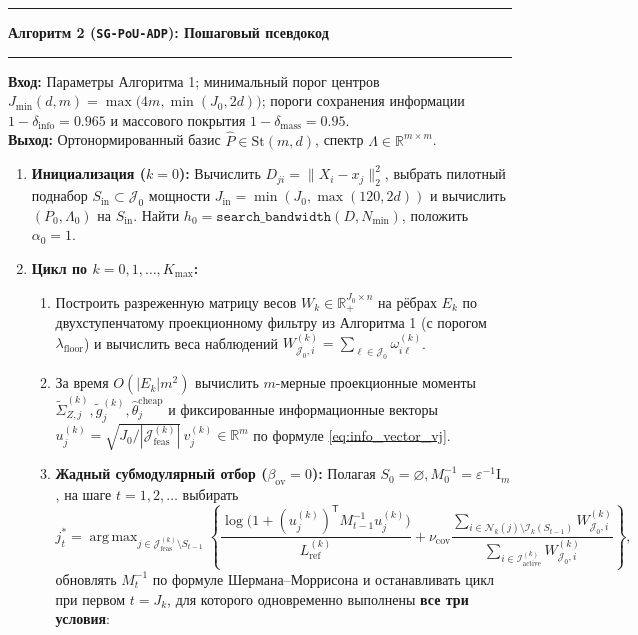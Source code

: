 \documentclass[11pt,a4paper]{article}
\newcommand{\R}{\mathbb{R}}
\newcommand{\Id}{\mathrm{I}}
\newcommand{\T}{^{\mathsf{T}}}
\newcommand{\St}{\mathrm{St}}
\newcommand{\II}{\mathcal{I}}
\newcommand{\JJJ}{\mathcal{J}}
\newcommand{\init}{\mathrm{in}}
\DeclareMathOperator{\argmax}{arg\,max}
\theoremstyle{definition}
\theoremstyle{remark}
\begin{document}
\vspace{4pt}
\noindent\rule{\textwidth}{0.8pt}
\textbf{Алгоритм 2 (\texttt{SG-PoU-ADP}): Пошаговый псевдокод}\\
\rule{\textwidth}{0.4pt}
\textbf{Вход:} Параметры Алгоритма 1; минимальный порог центров $J_{\min}(d,m) = \max\bigl(4m, \min(J_0, 2d)\bigr)$; пороги сохранения информации $1 - \delta_{\mathrm{info}} = 0.965$ и массового покрытия $1 - \delta_{\mathrm{mass}} = 0.95$.\\
\textbf{Выход:} Ортонормированный базис $\hat{P} \in \St(m,d)$, спектр $\hat{\Lambda} \in \R^{m \times m}$.
\begin{enumerate}
    \item \textbf{Инициализация ($k=0$):} Вычислить $D_{ji} = \|X_i - x_j\|_2^2$, выбрать пилотный поднабор $S_{\init} \subset \JJJ_0$ мощности $J_{\init} = \min(J_0, \max(120, 2d))$ и вычислить $(P_0, \Lambda_0)$ на $S_{\init}$. Найти $h_0 = \texttt{search\_bandwidth}(D, N_{\min})$, положить $\alpha_0 = 1$.
    \item \textbf{Цикл по $k = 0, 1, \ldots, K_{\max}$:}
    \begin{enumerate}
        \item Построить разреженную матрицу весов $W_k \in \R_+^{J_0 \times n}$ на рёбрах $E_k$ по двухступенчатому проекционному фильтру из Алгоритма 1 (с порогом $\lambda_{\mathrm{floor}}$) и вычислить веса наблюдений $W_{\JJJ_0, i}^{(k)} = \sum_{\ell \in \JJJ_0}\omega_{i\ell}^{(k)}$.
        \item За время $O(|E_k|m^2)$ вычислить $m$-мерные проекционные моменты $\widetilde{\Sigma}_{Z,j}^{(k)}, \tilde{g}_j^{(k)}, \hat{\theta}_j^{\mathrm{cheap}}$ и фиксированные информационные векторы $u_j^{(k)} = \sqrt{J_0 / |\JJJ_{\mathrm{feas}}^{(k)}|}\,v_j^{(k)} \in \R^m$ по формуле \eqref{eq:info_vector_vj}.
        \item \textbf{Жадный субмодулярный отбор ($\beta_{\mathrm{ov}} = 0$):} Полагая $S_0 = \varnothing, M_0^{-1} = \varepsilon^{-1}\Id_m$, на шаге $t = 1, 2, \ldots$ выбирать
        \[
            j_t^* = \argmax_{j \in \JJJ_{\mathrm{feas}}^{(k)} \setminus S_{t-1}} \left\{ \frac{\log\bigl(1 + (u_j^{(k)})\T M_{t-1}^{-1} u_j^{(k)}\bigr)}{L_{\mathrm{ref}}^{(k)}} + \nu_{\mathrm{cov}} \frac{\sum_{i \in \mathcal{N}_k(j) \setminus \II_k(S_{t-1})} W_{\JJJ_0, i}^{(k)}}{\sum_{i \in \II_{\mathrm{active}}^{(k)}} W_{\JJJ_0, i}^{(k)}} \right\},
        \]
        обновлять $M_t^{-1}$ по формуле Шермана--Моррисона и останавливать цикл при первом $t = J_k$, для которого одновременно выполнены \textbf{все три условия}:

\end{enumerate}
\end{enumerate}
\end{document}
